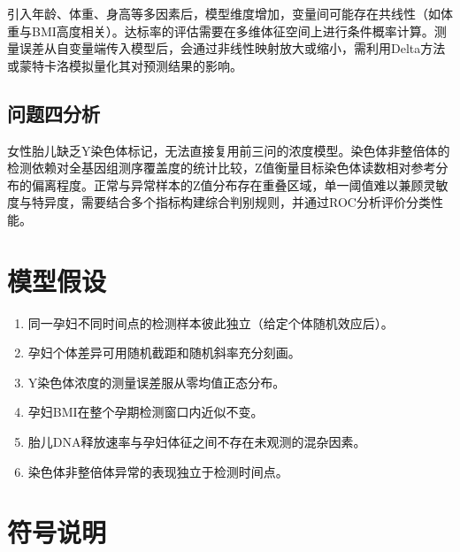 \documentclass{cumcmthesis}
\begin{document}
引入年龄、体重、身高等多因素后，模型维度增加，变量间可能存在共线性（如体重与BMI高度相关）。达标率的评估需要在多维体征空间上进行条件概率计算。测量误差从自变量端传入模型后，会通过非线性映射放大或缩小，需利用Delta方法或蒙特卡洛模拟量化其对预测结果的影响。

\subsection{问题四分析}

女性胎儿缺乏Y染色体标记，无法直接复用前三问的浓度模型。染色体非整倍体的检测依赖对全基因组测序覆盖度的统计比较，Z值衡量目标染色体读数相对参考分布的偏离程度。正常与异常样本的Z值分布存在重叠区域，单一阈值难以兼顾灵敏度与特异度，需要结合多个指标构建综合判别规则，并通过ROC分析评价分类性能。

\section{模型假设}

\begin{enumerate}
    \item 同一孕妇不同时间点的检测样本彼此独立（给定个体随机效应后）。
    \item 孕妇个体差异可用随机截距和随机斜率充分刻画。
    \item Y染色体浓度的测量误差服从零均值正态分布。
    \item 孕妇BMI在整个孕期检测窗口内近似不变。
    \item 胎儿DNA释放速率与孕妇体征之间不存在未观测的混杂因素。
    \item 染色体非整倍体异常的表现独立于检测时间点。
\end{enumerate}

\section{符号说明}
\end{document}
